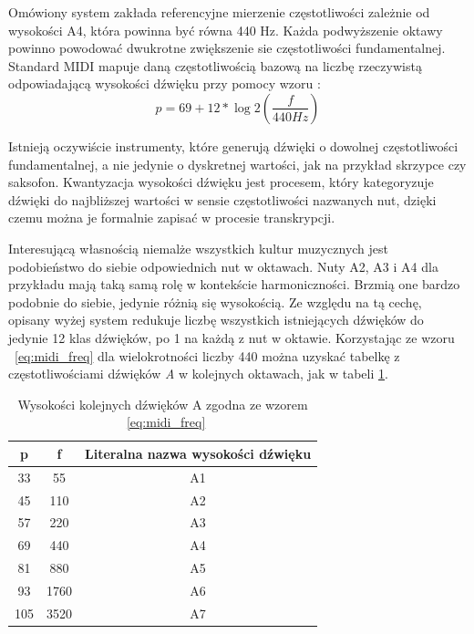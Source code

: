 \documentclass[12pt,a4paper,twoside]{mwart}
\begin{document}
Omówiony system zakłada referencyjne mierzenie częstotliwości zależnie od wysokości A4, która powinna być równa 440 Hz. Każda podwyższenie oktawy powinno powodować dwukrotne zwiększenie sie częstotliwości fundamentalnej. Standard MIDI mapuje daną częstotliwością bazową na liczbę rzeczywistą odpowiadającą wysokości dźwięku przy pomocy wzoru \cite[67-71]{Homerecording:LevelUp}:
\begin{equation} \label{eq:midi_freq}
p = 69 + 12 * \log{2}(\frac{f}{440 Hz})
\end{equation}

Istnieją oczywiście instrumenty, które generują dźwięki o dowolnej częstotliwości fundamentalnej, a nie jedynie o dyskretnej wartości, jak na przykład skrzypce czy saksofon. Kwantyzacja wysokości dźwięku jest procesem, który kategoryzuje dźwięki do najbliższej wartości w sensie częstotliwości nazwanych nut, dzięki czemu można je formalnie zapisać w procesie transkrypcji.

Interesującą własnością niemalże wszystkich kultur muzycznych jest podobieństwo do siebie odpowiednich nut w oktawach. Nuty A2, A3 i A4 dla przykładu mają taką samą rolę w kontekście harmoniczności. Brzmią one bardzo podobnie do siebie, jedynie różnią się wysokością. Ze względu na tą cechę, opisany wyżej system redukuje liczbę wszystkich istniejących dźwięków do jedynie 12 klas dźwięków, po 1 na każdą z nut w oktawie. Korzystając ze wzoru ~\ref{eq:midi_freq} dla wielokrotności liczby 440 można uzyskać tabelkę z częstotliwościami dźwięków \textit{A} w kolejnych oktawach, jak w tabeli \ref{tab:FqMidi}.

\begin{table}[ht]
  \begin{center}
    \begin{tabular}{ |c|c|c| } 
    \hline
    p & f & Literalna nazwa wysokości dźwięku\\
    \hline
    33 & 55 & A1\\
    45 & 110 & A2\\
    57 & 220 & A3\\
    69 & 440 & A4\\
    81 & 880 & A5\\
    93 & 1760 & A6\\
    105 & 3520 & A7\\
    \hline
    \end{tabular}
  \end{center}
  \caption{Wysokości kolejnych dźwięków A zgodna ze wzorem ~\ref{eq:midi_freq}}
  \label{tab:FqMidi}
\end{table}
\end{document}
